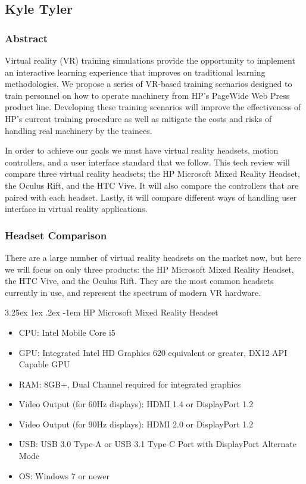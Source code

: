 \documentclass[onecolumn, draftclsnofoot,10pt, compsoc]{IEEEtran}
\makeatletter
\newcounter{subsubsubsection}[subsubsection]
\renewcommand\paragraph{\@startsection{paragraph}{5}{\z@}%
  {3.25ex \@plus1ex \@minus.2ex}%
  {-1em}%
  {\normalfont\normalsize\bfseries}}
\makeatother
\begin{document}
\subsection{Kyle Tyler}

\subsubsection*{Abstract}
Virtual reality (VR) training simulations provide the opportunity to implement an interactive learning experience that improves on traditional learning methodologies. We propose a series of VR-based training scenarios designed to train personnel on how to operate machinery from HP’s PageWide Web Press product line. Developing these training scenarios will improve the effectiveness of HP’s current training procedure as well as mitigate the costs and risks of handling real machinery by the trainees.

In order to achieve our goals we must have virtual reality headsets, motion controllers, and a user interface standard that we follow. This tech review will compare three virtual reality headsets; the HP Microsoft Mixed Reality Headset, the Oculus Rift, and the HTC Vive. It will also compare the controllers that are paired with each headset. Lastly, it will compare different ways of handling user interface in virtual reality applications.
\subsubsection{Headset Comparison}
There are a large number of virtual reality headsets on the market now, but here we will focus on only three products: the HP Microsoft Mixed Reality Headset, the HTC Vive, and the Oculus Rift. They are the most common headsets currently in use, and represent the spectrum of modern VR hardware.


\paragraph{HP Microsoft Mixed Reality Headset}
\begin{itemize}
    \item CPU: Intel Mobile Core i5
    \item GPU: Integrated Intel HD Graphics 620 equivalent or greater, DX12 API Capable GPU
    \item RAM: 8GB+, Dual Channel required for integrated graphics
    \item Video Output (for 60Hz displays): HDMI 1.4 or DisplayPort 1.2
    \item Video Output (for 90Hz displays): HDMI 2.0 or DisplayPort 1.2 
    \item USB: USB 3.0 Type-A or USB 3.1 Type-C Port with DisplayPort Alternate Mode
    \item OS: Windows 7 or newer
\end{itemize}
\end{document}
